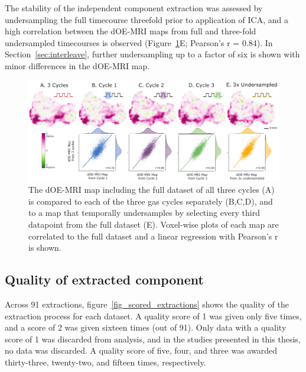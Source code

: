 The stability of the independent component extraction was assessed by undersampling the full timecourse threefold prior to application of \acs{ICA}, and a high correlation between the \acs{dOE-MRI} maps from full and three-fold undersampled timecourses is observed (Figure~\ref{fig_repeatability}E; Pearson's r = 0.84). 
In Section~\ref{sec:interleave}, further undersampling up to a factor of six is shown with minor differences in the \acs{dOE-MRI} map.

\begin{figure}[htbp]
   \centering
   \includegraphics[width=\textwidth]{oemri_thesis1/oemri_thesis1-images/fig4_repeatability.pdf} %
   \caption{The \acs{dOE-MRI} map including the full dataset of all three cycles (A) is compared to each of the three gas cycles separately (B,C,D), and to a map that temporally undersamples by selecting every third datapoint from the full dataset (E).
Voxel-wise plots of each map are correlated to the full dataset and a linear regression with Pearson's r is shown.
   \label{fig_repeatability}}
\end{figure}

\subsection{Quality of extracted component}
\label{res4}

Across 91 extractions, figure~\ref{fig_scored_extractions} shows the quality of the extraction process for each dataset.
A quality score of 1 was given only five times, and a score of 2 was given sixteen times (out of 91).
Only data with a quality score of 1 was discarded from analysis, and in the studies presented in this thesis, no data was discarded.
A quality score of five, four, and three was awarded thirty-three, twenty-two, and fifteen times, respectively. 

